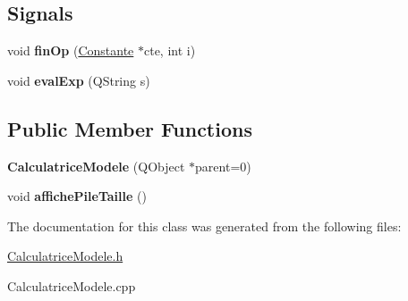 \subsection*{Signals}
\begin{DoxyCompactItemize}
\item 
\hypertarget{class_calculatrice_modele_a491b838119e11d843a5b7ae9ed1d3c9c}{void {\bfseries fin\-Op} (\hyperlink{class_calcul_1_1_constante}{Constante} $\ast$cte, int i)}\label{class_calculatrice_modele_a491b838119e11d843a5b7ae9ed1d3c9c}

\item 
\hypertarget{class_calculatrice_modele_ad741ddfdf7320455e53b0499bd9ec6b6}{void {\bfseries eval\-Exp} (Q\-String s)}\label{class_calculatrice_modele_ad741ddfdf7320455e53b0499bd9ec6b6}

\end{DoxyCompactItemize}
\subsection*{Public Member Functions}
\begin{DoxyCompactItemize}
\item 
\hypertarget{class_calculatrice_modele_acdb374ef7094036d07dfd59241674a7c}{{\bfseries Calculatrice\-Modele} (Q\-Object $\ast$parent=0)}\label{class_calculatrice_modele_acdb374ef7094036d07dfd59241674a7c}

\item 
\hypertarget{class_calculatrice_modele_ae311466b783cc6418efeaef854df461a}{void {\bfseries affiche\-Pile\-Taille} ()}\label{class_calculatrice_modele_ae311466b783cc6418efeaef854df461a}

\end{DoxyCompactItemize}


The documentation for this class was generated from the following files\-:\begin{DoxyCompactItemize}
\item 
\hyperlink{_calculatrice_modele_8h}{Calculatrice\-Modele.\-h}\item 
Calculatrice\-Modele.\-cpp\end{DoxyCompactItemize}
